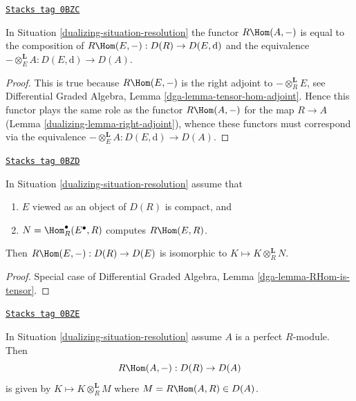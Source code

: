 \begin{lemma}
\label{dualizing-lemma-RHom-dga}
\href{https://stacks.math.columbia.edu/tag/0BZC}{\texttt{Stacks tag 0BZC}}

In Situation \ref{dualizing-situation-resolution} the functor $R\Hom(A, -)$
is equal to the composition of
$R\Hom(E, -) : D(R) \to D(E, \text{d})$
and the equivalence $- \otimes^\mathbf{L}_E A : D(E, \text{d}) \to D(A)$.
\end{lemma}

\begin{proof}

This is true because $R\Hom(E, -)$ is the right adjoint
to $- \otimes^\mathbf{L}_R E$, see
Differential Graded Algebra, Lemma \ref{dga-lemma-tensor-hom-adjoint}.
Hence this functor plays the same role as the functor
$R\Hom(A, -)$ for the map $R \to A$ (Lemma \ref{dualizing-lemma-right-adjoint}),
whence these functors must correspond via the equivalence
$- \otimes^\mathbf{L}_E A : D(E, \text{d}) \to D(A)$.
\end{proof}

\begin{lemma}
\label{dualizing-lemma-RHom-is-tensor}
\href{https://stacks.math.columbia.edu/tag/0BZD}{\texttt{Stacks tag 0BZD}}

In Situation \ref{dualizing-situation-resolution} assume that
\begin{enumerate}
\item $E$ viewed as an object of $D(R)$ is compact, and
\item $N = \Hom^\bullet_R(E^\bullet, R)$ computes $R\Hom(E, R)$.
\end{enumerate}
Then $R\Hom(E, -) : D(R) \to D(E)$ is isomorphic to
$K \mapsto K \otimes_R^\mathbf{L} N$.
\end{lemma}

\begin{proof}
Special case of Differential Graded Algebra, Lemma
\ref{dga-lemma-RHom-is-tensor}.
\end{proof}

\begin{lemma}
\label{dualizing-lemma-RHom-is-tensor-special}
\href{https://stacks.math.columbia.edu/tag/0BZE}{\texttt{Stacks tag 0BZE}}

In Situation \ref{dualizing-situation-resolution} assume $A$ is a perfect $R$-module.
Then
$$
R\Hom(A, -) : D(R) \to D(A)
$$
is given by $K \mapsto K \otimes_R^\mathbf{L} M$
where $M = R\Hom(A, R) \in D(A)$.
\end{lemma}

